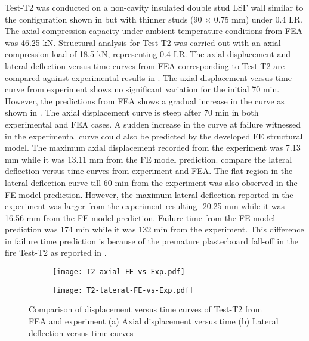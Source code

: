 Test-T2 was conducted on a non-cavity insulated double stud LSF wall similar to the configuration shown in  but with thinner studs (90 $\times$ 0.75 mm) under 0.4 LR. The axial compression capacity under ambient temperature conditions from FEA was 46.25 kN. Structural analysis for Test-T2 was carried out with an axial compression load of 18.5 kN, representing 0.4 LR. The axial displacement and lateral deflection versus time curves from FEA corresponding to Test-T2 are compared against experimental results in . The axial displacement versus time curve from experiment shows no significant variation for the initial 70 min. However, the predictions from FEA shows a gradual increase in the curve as shown in . The axial displacement curve is steep after 70 min in both experimental and FEA cases. A sudden increase in the curve at failure witnessed in the experimental curve could also be predicted by the developed FE structural model. The maximum axial displacement recorded from the experiment was 7.13 mm while it was 13.11 mm from the FE model prediction.  compare the lateral deflection versus time curves from experiment and FEA. The flat region in the lateral deflection curve till 60 min from the experiment was also observed in the FE model prediction. However, the maximum lateral deflection reported in the experiment was larger from the experiment resulting -20.25 mm while it was 16.56 mm from the FE model prediction. Failure time from the FE model prediction was 174 min while it was 132 min from the experiment. This difference in failure time prediction is because of the premature plasterboard fall-off in the fire Test-T2 as reported in .        
\begin{figure}[!htbp]
	\centering
	\begin{subfigure}[b]{0.7\textwidth}
		\centering
		\texttt{[image: T2-axial-FE-vs-Exp.pdf]}
		\caption{}
		\label{subfig:T2-axial-FE-vs-Exp}
	\end{subfigure}
	\begin{subfigure}[b]{0.7\textwidth}
		\centering
		\texttt{[image: T2-lateral-FE-vs-Exp.pdf]}
		\caption{}
		\label{subfig:T2-lateral-FE-vs-Exp}
	\end{subfigure}
	   \caption{Comparison of displacement versus time curves of Test-T2 from FEA and experiment (a) Axial displacement versus time (b) Lateral deflection versus time curves}
	   \label{fig:T2-structural-FE-vs-Exp}
\end{figure} 
